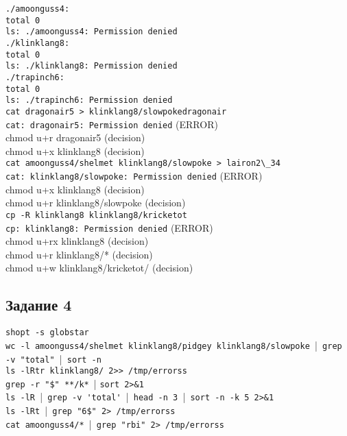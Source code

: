 \noindent \verb|./amoonguss4:| \\
\verb|total 0| \\
\verb|ls: ./amoonguss4: Permission denied| \\

\noindent \verb|./klinklang8:| \\
\verb|total 0| \\
\verb|ls: ./klinklang8: Permission denied| \\

\noindent \verb|./trapinch6:| \\
\verb|total 0| \\ 
\verb|ls: ./trapinch6: Permission denied| \\

\noindent \verb|cat dragonair5 > klinklang8/slowpokedragonair| \\
\verb|cat: dragonair5: Permission denied| (ERROR) \\
chmod u+r dragonair5 (decision) \\
chmod u+x klinklang8 (decision) \\

\noindent \verb|cat amoonguss4/shelmet klinklang8/slowpoke > lairon2\_34| \\
\verb|cat: klinklang8/slowpoke: Permission denied| (ERROR) \\
chmod u+x klinklang8 (decision) \\
chmod u+r klinklang8/slowpoke (decision) \\

\noindent \verb|cp -R klinklang8 klinklang8/kricketot| \\
\verb|cp: klinklang8: Permission denied| (ERROR) \\
chmod u+rx klinklang8 (decision) \\
chmod u+r klinklang8/* (decision) \\
chmod u+w klinklang8/kricketot/ (decision) \\

\subsection*{Задание 4}
\verb|shopt -s globstar| \\
\verb|wc -l amoonguss4/shelmet klinklang8/pidgey klinklang8/slowpoke ||\verb| grep -v "total" ||\verb| sort -n| \\
\verb|ls -lRtr klinklang8/ 2>> /tmp/errorss| \\
\verb|grep -r "$" **/k* || \verb|sort 2>&1| \\
\verb|ls -lR ||\verb| grep -v 'total' ||\verb| head -n 3 ||\verb| sort -n -k 5 2>&1| \\
\verb|ls -lRt ||\verb| grep "6$" 2> /tmp/errorss| \\
\verb|cat amoonguss4/* ||\verb| grep "rbi" 2> /tmp/errorss| \\
